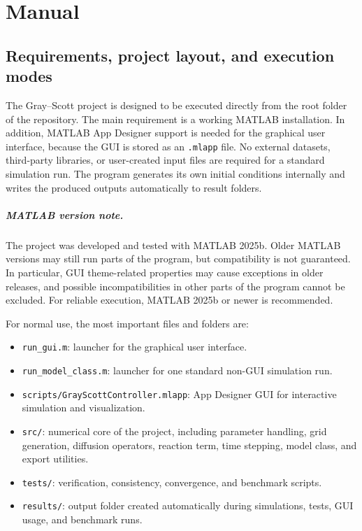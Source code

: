 \chapter{Manual}

\section{Requirements, project layout, and execution modes}
\label{sec:manual_requirements}

The Gray--Scott project is designed to be executed directly from the root folder of the repository. The main requirement is a working MATLAB installation. In addition, MATLAB App Designer support is needed for the graphical user interface, because the GUI is stored as an \texttt{.mlapp} file. No external datasets, third-party libraries, or user-created input files are required for a standard simulation run. The program generates its own initial conditions internally and writes the produced outputs automatically to result folders.

\paragraph{MATLAB version note.}
The project was developed and tested with MATLAB 2025b. Older MATLAB versions may still run parts of the program, but compatibility is not guaranteed. In particular, GUI theme-related properties may cause exceptions in older releases, and possible incompatibilities in other parts of the program cannot be excluded. For reliable execution, MATLAB 2025b or newer is recommended.

For normal use, the most important files and folders are:

\begin{itemize}
    \item \texttt{run\_gui.m}: launcher for the graphical user interface.
    \item \texttt{run\_model\_class.m}: launcher for one standard non-GUI simulation run.
    \item \texttt{scripts/GrayScottController.mlapp}: App Designer GUI for interactive simulation and visualization.
    \item \texttt{src/}: numerical core of the project, including parameter handling, grid generation, diffusion operators, reaction term, time stepping, model class, and export utilities.
    \item \texttt{tests/}: verification, consistency, convergence, and benchmark scripts.
    \item \texttt{results/}: output folder created automatically during simulations, tests, GUI usage, and benchmark runs.
\end{itemize}

